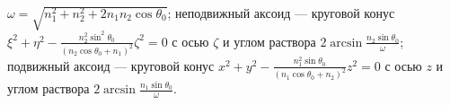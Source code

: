 $\omega = \sqrt{n^2_1 + n^2_2 + 2n_1n_2\cos{\theta _0}}$;
неподвижный аксоид --- круговой конус
$\xi ^2 + \eta ^2 -
\frac{n^2_2 \sin^2{\theta _0}}{(n_2\cos{\theta _0} + n_1)^2}\zeta ^2 = 0$
с осью $\zeta$ и углом раствора $2\arcsin{\frac{n_2\sin{\theta _0}}{\omega}}$;
подвижный аксоид --- круговой конус
$x^2 + y^2 - \frac{n^2_1 \sin{\theta _0}}{(n_1\cos{\theta _0} + n_2)^2}z^2 = 0$
с осью $z$ и углом раствора $2\arcsin{\frac{n_1\sin{\theta _0}}{\omega}}$.
